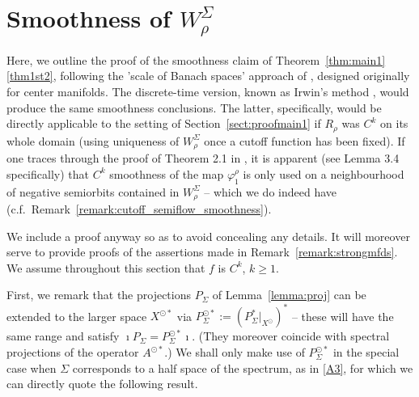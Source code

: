 \documentclass[a4paper, 12pt, oneside, reqno, notitlepage]{amsart}
\theoremstyle{plain}
\theoremstyle{definition}
\theoremstyle{remark}
\begin{document}
\section{Smoothness of \texorpdfstring{$W^\Sigma_\rho$}{}}
\label{sect:mfdsmoothness}



Here, we outline the proof of the smoothness claim of Theorem~\ref{thm:main1}\ref{thm1st2}, following the 'scale of Banach spaces' approach of \cite{vanderbauwhede1987center}, designed originally for center manifolds.
The discrete-time version, known as Irwin's method \cite{irwin1980new,de1995irwin}, would produce the same smoothness conclusions.
The latter, specifically, would be directly applicable to the setting of Section~\ref{sect:proofmain1} if $R_\rho$ was $C^k$ on its whole domain (using uniqueness of $W^\Sigma_\rho$ once a cutoff function has been fixed).
If one traces through the proof of Theorem 2.1 in \cite{de1995irwin}, it is apparent (see Lemma 3.4 specifically) that $C^k$ smoothness of the map $\varphi^\rho_1$ is only used on a neighbourhood of negative semiorbits contained in $W^\Sigma_\rho$ -- which we do indeed have (c.f.\ Remark~\ref{remark:cutoff_semiflow_smoothness}).

We  include a proof anyway so as to avoid concealing any details. 
It will moreover serve to provide proofs of the assertions made in Remark~\ref{remark:strongmfds}.
We assume throughout this section that $f$ is $C^k$, $k \geq 1$.


First, we remark that the projections $P_\Sigma$ of Lemma~\ref{lemma:proj} can be extended to the larger space $X^{\odot *}$ via $P^{\odot *}_\Sigma :=(P_\Sigma^*|_{X^\odot})^*$ -- these will have the same range and satisfy $\imath P_\Sigma =P^{\odot *}_\Sigma \imath$.
(They moreover coincide with spectral projections of the operator $A^{\odot *}$.) 
We shall only make use of $P^{\odot *}_\Sigma$ in the special case when $\Sigma$ corresponds to a half space of the spectrum, as in \ref{A3}, for which we can directly quote the following result.
\end{document}
